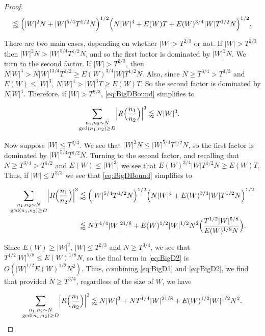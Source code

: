 \documentclass{amsart}
\theoremstyle{plain}
\numberwithin{equation}{section}
\begin{document}
\begin{proof}
\begin{equation}
 \lessapprox \Bigl(|W|^2N+|W|^{5/4}T^{1/2}N\Bigr)^{1/2}\Bigl(N|W|^4+E(W)T+E(W)^{3/4}|W|T^{1/2}N\Bigr)^{1/2}.\label{eq:BigDBound}
\end{equation}

There are two main cases, depending on whether $|W| > T^{2/3}$ or not.  If $|W|>T^{2/3}$ then $|W|^2N>|W|^{5/4}T^{1/2}N$, and so the first factor is dominated by $|W|^2 N$.   We turn to the second factor.  If $|W| > T^{2/3}$, then $N|W|^4>N|W|^{13/4}T^{1/2}\ge E(W)^{3/4}|W|T^{1/2}N$.   Also, since $N \ge T^{3/4} > T^{1/3}$ and $E(W)\le |W|^3$,  $N|W|^4>|W|^3T\ge E(W)T$.   So the second factor is dominated by $N|W|^4$.   Therefore, if $|W|>T^{2/3}$, \eqref{eq:BigDBound} simplifies to

\begin{align}
&\sum_{\substack{n_1,n_2\sim N\\ \gcd(n_1,n_2)\ge D}}\Bigl|R\Bigl(\frac{n_1}{n_2}\Bigr)\Bigr|^3\lessapprox N|W|^3.\label{eq:BigD1}
\end{align}

Now suppose $|W| \le T^{2/3}$.   We see that $|W|^2N\le |W|^{5/4}T^{1/2}N$, so the first factor is dominated by $|W|^{5/4} T^{1/2} N$.   Turning to the second factor, and recalling that $N \ge T^{3/4} > T^{1/2}$ and $E(W)\le |W|^3$,   we see that 
$E(W)^{3/4}|W|T^{1/2}N\ge E(W)T$. Thus, if $|W|\le T^{2/3}$ we see that \eqref{eq:BigDBound} simplifies to

\begin{align}
\sum_{\substack{n_1,n_2\sim N\\ \gcd(n_1,n_2)\ge D}}\Bigl|R\Bigl(\frac{n_1}{n_2}\Bigr)\Bigr|^3 &\lessapprox \Bigl(|W|^{5/4}T^{1/2}N\Bigr)^{1/2}\Bigl(N|W|^4+E(W)^{3/4}|W|T^{1/2}N\Bigr)^{1/2}\nonumber\\
&\lessapprox NT^{1/4}|W|^{21/8}+E(W)^{1/2}|W|^{1/2}N^2\Bigl(\frac{T^{1/2}|W|^{5/8}}{E(W)^{1/8}N}\Bigr).\label{eq:BigD2}
\end{align}

Since $E(W)\ge |W|^2$, $|W|\le T^{2/3}$ and $N\ge T^{3/4}$, we see that $T^{1/2}|W|^{5/8}\le E(W)^{1/8}N$, so the final term in \eqref{eq:BigD2} is $O(|W|^{1/2}E(W)^{1/2}N^2)$. Thus, combining \eqref{eq:BigD1} and \eqref{eq:BigD2}, we find that  provided $N\ge T^{3/4}$, regardless of the size of $W$, we have

\[
\sum_{\substack{n_1,n_2\sim N\\ \gcd(n_1,n_2)\ge D}}\Bigl|R\Bigl(\frac{n_1}{n_2}\Bigr)\Bigr|^3\lessapprox N|W|^3+NT^{1/4}|W|^{21/8}+E(W)^{1/2}|W|^{1/2}N^2.\qedhere
\]

\end{proof}
\end{document}
